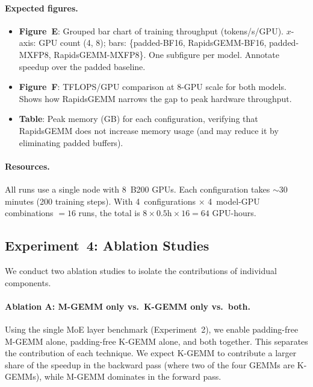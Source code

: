 \documentclass[11pt,a4paper]{article}
\theoremstyle{definition}
\begin{document}
\paragraph{Expected figures.}
\begin{itemize}
  \item \textbf{Figure~E}:
    Grouped bar chart of training throughput (tokens/s/GPU).
    $x$-axis: GPU count (4, 8); bars: \{padded-BF16,
    RapidsGEMM-BF16, padded-MXFP8, RapidsGEMM-MXFP8\}.
    One subfigure per model.
    Annotate speedup over the padded baseline.
  \item \textbf{Figure~F}:
    TFLOPS/GPU comparison at 8-GPU scale for both models.
    Shows how RapidsGEMM narrows the gap to peak hardware throughput.
  \item \textbf{Table}: Peak memory (GB) for each configuration,
    verifying that RapidsGEMM does not increase memory usage
    (and may reduce it by eliminating padded buffers).
\end{itemize}

\paragraph{Resources.}
All runs use a single node with 8~B200 GPUs.
Each configuration takes $\sim$30 minutes (200 training steps).
With 4~configurations $\times$ 4~model-GPU combinations $= 16$ runs,
the total is $8 \times 0.5\text{h} \times 16 = 64$ GPU-hours.

\subsection{Experiment~4: Ablation Studies}
\label{sec:exp-ablation}

We conduct two ablation studies to isolate the contributions of
individual components.

\paragraph{Ablation A: M-GEMM only vs.\ K-GEMM only vs.\ both.}
Using the single MoE layer benchmark (Experiment~2), we enable
padding-free M-GEMM alone, padding-free K-GEMM alone, and both
together.
This separates the contribution of each technique.
We expect K-GEMM to contribute a larger share of the speedup in the
backward pass (where two of the four GEMMs are K-GEMMs), while
M-GEMM dominates in the forward pass.
\end{document}
